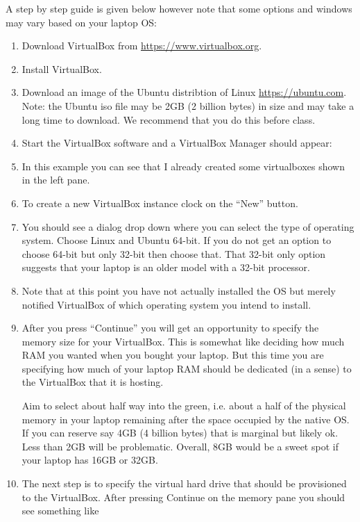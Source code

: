 A step by step guide is given below however note that some options and windows may vary based on your laptop OS:

\begin{enumerate}[start=1,label={\bfseries Step \#\arabic*:}]
    \item Download VirtualBox from \href{https://www.virtualbox.org}{https://www.virtualbox.org}.
    \item Install VirtualBox.
    \item Download an image of the Ubuntu distribtion of Linux \href{https://ubuntu.com}{https://ubuntu.com}. Note: the Ubuntu iso file may be 2GB (2 billion bytes) in size and may take a long time to download. We recommend that you do this before class.
    \item Start the VirtualBox software and a VirtualBox Manager should appear:
    
   
    \item In this example you can see that I already created some virtualboxes shown in the left pane.
    \item To create a new VirtualBox instance clock on the ``New'' button.
    \item You should see a dialog drop down where you can select the type of operating system. Choose Linux and Ubuntu 64-bit. If you do not get an option to choose 64-bit but only 32-bit then choose that. That 32-bit only option suggests that your laptop is an older model with a 32-bit processor. 
    
 
    \item Note that at this point you have not actually installed the OS but merely notified VirtualBox of which operating system you intend to install.
    \item After you press ``Continue'' you will get an opportunity to specify the memory size for your VirtualBox. This is somewhat like deciding how much RAM you wanted when you bought your laptop. But this time you are specifying how much of your laptop RAM should be dedicated (in a sense) to the VirtualBox that it is hosting. 
     
    
    Aim to select about half way into the green, i.e. about a half of the physical memory in your laptop remaining after the space occupied by the native OS. If you can reserve say 4GB (4 billion bytes) that is marginal but likely ok. Less than 2GB will be problematic. Overall, 8GB would be a sweet spot if your laptop has 16GB or 32GB.
    \item The next step is to specify the virtual hard drive that should be provisioned to the VirtualBox. After pressing Continue on the memory pane you should see something like
    

\end{enumerate}
